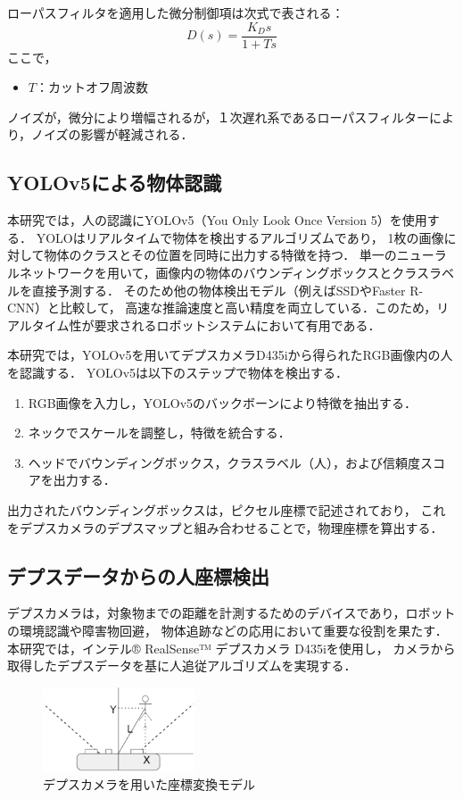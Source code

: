 ローパスフィルタを適用した微分制御項は次式で表される：
\begin{equation}
    D(s) = \frac{K_D s}{1 + T s}
    \label{eq:lowpass_filter}
\end{equation}
ここで，
\begin{itemize}
    \item $T$：カットオフ周波数
\end{itemize}

ノイズが，微分により増幅されるが，１次遅れ系であるローパスフィルターにより，ノイズの影響が軽減される．

\subsection{YOLOv5による物体認識}
本研究では，人の認識にYOLOv5（You Only Look Once Version 5）を使用する．
YOLOはリアルタイムで物体を検出するアルゴリズムであり，
1枚の画像に対して物体のクラスとその位置を同時に出力する特徴を持つ．
単一のニューラルネットワークを用いて，画像内の物体のバウンディングボックスとクラスラベルを直接予測する\cite{yolo}．
そのため他の物体検出モデル（例えばSSDやFaster R-CNN）と比較して，
高速な推論速度と高い精度を両立している．このため，リアルタイム性が要求されるロボットシステムにおいて有用である．

本研究では，YOLOv5を用いてデプスカメラD435iから得られたRGB画像内の人を認識する．
YOLOv5は以下のステップで物体を検出する．
\begin{enumerate}
    \item RGB画像を入力し，YOLOv5のバックボーンにより特徴を抽出する．
    \item ネックでスケールを調整し，特徴を統合する．
    \item ヘッドでバウンディングボックス，クラスラベル（人），および信頼度スコアを出力する．
\end{enumerate}

出力されたバウンディングボックスは，ピクセル座標で記述されており，
これをデプスカメラのデプスマップと組み合わせることで，物理座標を算出する．


\subsection{デプスデータからの人座標検出}
デプスカメラは，対象物までの距離を計測するためのデバイスであり，ロボットの環境認識や障害物回避，
物体追跡などの応用において重要な役割を果たす．
本研究では，インテル® RealSense™ デプスカメラ D435iを使用し，
カメラから取得したデプスデータを基に人追従アルゴリズムを実現する．
\begin{figure}[h]
    \centering
    \includegraphics[width=0.4\textwidth]{figure/rialsens_man.pdf}
    \caption{デプスカメラを用いた座標変換モデル}
    \label{fig:coordinate_conversion}
\end{figure}

